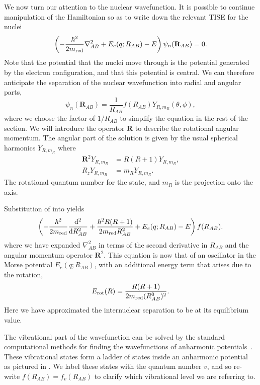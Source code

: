 We now turn our attention to the nuclear wavefunction. It is possible to
continue manipulation of the Hamiltonian so as to write down the relevant
TISE for the nuclei~\cite{brown_carrington_2003}
%
\begin{equation}
  \left(-\frac{\hbar^2}{2m_\text{red}{}}\nabla_{AB}^2 + E_e(q; R_{AB}) -
  E\right)\psi_n(\mathbf{R}_{AB}) = 0.
  \label{theory:eqn:nucTISE}
\end{equation}
%
Note that the potential that the nuclei move through is the potential
generated by the electron configuration, and that this potential is central. We
can therefore anticipate the separation of the nuclear wavefunction into radial
and angular parts,
%
\begin{equation}
  \psi_n(\mathbf{R}_{AB}) = \frac{1}{R_{AB}}f(R_{AB})Y_{R, m_R}(\theta, \phi),
  \label{theory:eqn:nucsep}
\end{equation}
%
where we choose the factor of $1/R_{AB}$ to simplify the equation in the rest
of the section. We will introduce the operator $\mathbf{R}$ to describe the
rotational angular momentum. The angular part of the solution is given by the usual
spherical harmonics $Y_{R, m_R}$ where
%
\begin{align}
  \mathbf{R}^2 Y_{R, m_R} &= R(R+1) Y_{R, m_R}, \\
  R_z Y_{R, m_R} &= m_R Y_{R, m_R}.
\end{align}
%
The rotational quantum number for the state, and $m_R$ is the projection onto
the axis.

Substitution of  into 
yields 
%
\begin{equation}
  \left(-\frac{\hbar^2}{2m_\text{red}{}}\frac{\dd^2}{\dd R_{AB}^2} +
    \frac{\hbar^2 R(R+1)}{2m_\text{red}{}R_{AB}^2} + E_e(q; R_{AB}) - E\right)f(R_{AB}).
\end{equation}
%
where we have expanded $\nabla_{AB}^2$ in terms of the second derivative in
$R_{AB}$ and the angular momentum operator $\mathbf{R}^2$. This equation is now
that of an oscillator in the Morse potential $E_e(q; R_{AB})$, with an
additional energy term that arises due to the rotation,
%
\begin{equation}
  E_\text{rot}(R) = \frac{R(R+1)}{2m_\text{red}{} (R_{AB}^0)^2}.
  \label{theory:eqn:rotenergy}
\end{equation}
%
Here we have approximated the internuclear separation to be at its equilibrium
value.

The vibrational part of the wavefunction can be solved by the standard
computational methods for finding the wavefunctions of anharmonic
potentials~\cite{Foot2005}. These vibrational states form a ladder of
states inside an anharmonic potential~\cite{Binney} as pictured in
. We label these states with the quantum number
$v$, and so re-write $f(R_{AB}) = f_v(R_{AB})$ to clarify which vibrational
level we are referring to.

